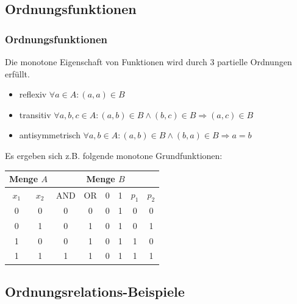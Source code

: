 \documentclass[hyperref={pdfpagelabels=false}]{beamer} %
\begin{document}
  \subsection{Ordnungsfunktionen}
  \begin{frame}%
    \frametitle{Ordnungsfunktionen}
    Die monotone Eigenschaft von Funktionen wird durch 3 partielle Ordnungen erfüllt.
    \begin{itemize}
      \item reflexiv $\forall a \in A: (a,a) \in B$\\
      \item transitiv $\forall a,b,c \in A: (a,b) \in B \land (b,c) \in B \Rightarrow (a,c) \in B$\\
      \item antisymmetrisch $\forall a,b \in A: (a,b) \in B \land (b,a) \in B \Rightarrow a=b$\\
    \end{itemize}
    Es ergeben sich z.B. folgende monotone Grundfunktionen:\\
    \begin{tabular}[t]{|cc|c|c|c|c|c|c|} \hline
      \multicolumn{2}{|c|}{Menge $A$} & \multicolumn{6}{|c|}{Menge $B$} \\ \hline
      $x_1$     & $x_2$ & AND   & OR    & 0     & 1     & $p_1$ & $p_2$\\ \hline
      0         & 0     & 0     & 0     & 0     & 1     & 0     & 0\\
      0         & 1     & 0     & 1     & 0     & 1     & 0     & 1\\
      1         & 0     & 0     & 1     & 0     & 1     & 1     & 0\\
      1         & 1     & 1     & 1     & 0     & 1     & 1     & 1\\ \hline
    \end{tabular}
  \end{frame}

  \subsection{Ordnungsrelations-Beispiele}
\end{document}
